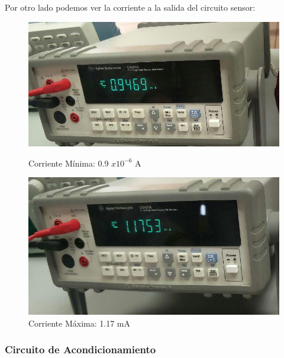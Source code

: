 \documentclass[12pt, fleqn]{article}                            %
\theoremstyle{break}                                            %
\begin{document}
            Por otro lado podemos ver la corriente a la salida del circuito sensor:
            \begin{figure}[!htb]
                \centering
                \begin{minipage}{.5\textwidth}
                    \centering
                \includegraphics[width=0.85\linewidth]{Medicion1AmperajeMin}
                \caption{Corriente Mínima: 0.9 $x10^{-6}$ A}
                \end{minipage}%
                \begin{minipage}{0.5\textwidth}
                    \centering
                \includegraphics[width=0.85\linewidth]{Medicion1AmperajeMax}
                \caption{Corriente Máxima: 1.17 mA}
                \end{minipage}
            \end{figure}

           

        \clearpage
        \subsubsection{Circuito de Acondicionamiento}  
\end{document}
